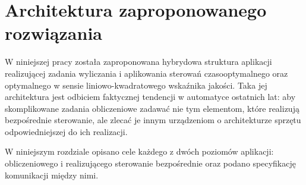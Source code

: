 \chapter{Architektura zaproponowanego rozwiązania}
\label{cha:arch}

W niniejszej pracy została zaproponowana hybrydowa struktura aplikacji realizującej zadania wyliczania i aplikowania sterowań czasooptymalnego oraz optymalnego w sensie liniowo-kwadratowego wskaźnika jakości.
Taka jej architektura jest odbiciem faktycznej tendencji w automatyce ostatnich lat: aby skomplikowane zadania obliczeniowe zadawać nie tym elementom, które realizują bezpośrednie sterowanie, ale zlecać je innym urządzeniom o architekturze sprzętu odpowiedniejszej do ich realizacji.

W niniejszym rozdziale opisano cele każdego z dwóch poziomów aplikacji: obliczeniowego i realizującego sterowanie bezpośrednie oraz podano specyfikację komunikacji między nimi.




